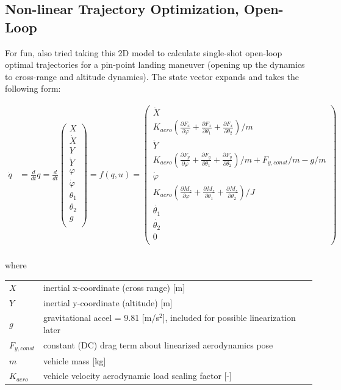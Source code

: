 \documentclass[12pt]{article}
\makeatletter
\newenvironment{conditions}
  {\par\vspace{\abovedisplayskip}\noindent\begin{tabular}{>{$}l<{$} @{${}={}$} l}}
  {\end{tabular}\par\vspace{\belowdisplayskip}}
\makeatother
\begin{document}
\bigskip\bigskip\bigskip\bigskip
\subsection*{Non-linear Trajectory Optimization, Open-Loop}

For fun, also tried taking this 2D model to calculate single-shot open-loop optimal trajectories for a pin-point landing maneuver (opening up the dynamics to cross-range and altitude dynamics).  The state vector expands and takes the following form:

\begin{align*}
\dot{q} &= \frac{d}{dt} q = \frac{d}{dt}\begin{pmatrix}
X \\
\dot{X}\\
Y \\
\dot{Y} \\
\varphi \\
\dot{\varphi} \\
\theta_1 \\
\theta_2 \\
g \\
\end{pmatrix} =
f(q, u) =\begin{pmatrix}
\dot{X} \\
K_{aero}(\frac{\partial F_x}{\partial \varphi} + \frac{\partial F_x}{\partial \theta_1} +\frac{\partial F_x}{\partial \theta_2})/m \\
\dot{Y} \\
K_{aero}(\frac{\partial F_y}{\partial \varphi} + \frac{\partial F_y}{\partial \theta_1} +\frac{\partial F_y}{\partial \theta_2})/m + F_{y, const}/m - g/m \\
\dot{\varphi} \\
K_{aero}(\frac{\partial M_z}{\partial \varphi} + \frac{\partial M_z}{\partial \theta_1} +\frac{\partial M_z}{\partial \theta_2})/J \\
\dot{\theta_1} \\
\dot{\theta_2} \\
0\\
\end{pmatrix} \\
\end{align*}

where

\begin{conditions}
X & inertial x-coordinate (cross range) [m] \\
Y & inertial y-coordinate (altitude) [m] \\
g & gravitational accel = 9.81 [m/s$^2$], included for possible linearization later \\
F_{y, const} & constant (DC) drag term about linearized aerodynamics pose \\
m & vehicle mass [kg] \\
K_{aero} & vehicle velocity aerodynamic load scaling factor [-] \\
\end{conditions}
\end{document}
